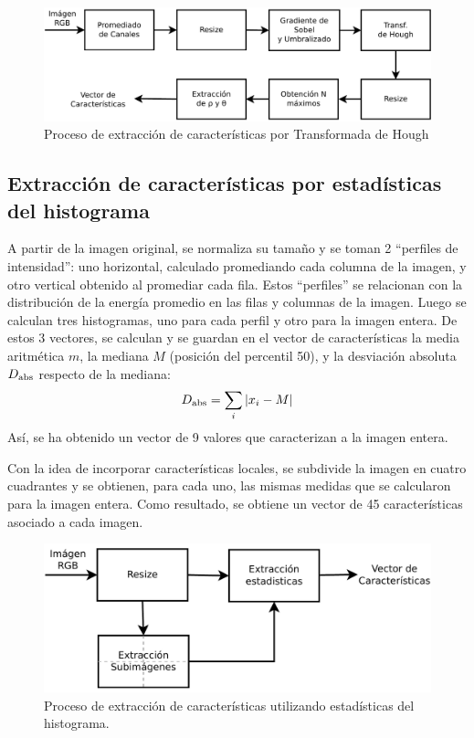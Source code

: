 \documentclass[conference,a4paper,10pt,oneside,final]{tfmpd}
\begin{document}
\begin{figure}
\begin{center}
\includegraphics[scale=0.25]{../diagramas/procesohough} 
\end{center}
\caption{Proceso de extracción de características por Transformada de Hough}
\label{procesohough}
\end{figure}
%
%
\subsection{Extracción de características por estadísticas del histograma}
A partir de la imagen original, se normaliza su tamaño y se toman 2
``perfiles de intensidad'': uno horizontal, calculado promediando
cada columna de la imagen, y otro vertical obtenido al promediar cada fila.
Estos ``perfiles'' se relacionan con la distribución de la energía promedio
en las filas y columnas de la imagen.
Luego se calculan tres histogramas, uno para cada perfil y otro para la
imagen entera. De estos 3 vectores, se calculan y se guardan en el
vector de características la media aritmética $m$, la mediana $M$ (posición del
percentil 50),  y la desviación absoluta $D_{\textrm{abs}}$ respecto de la mediana:
\begin{equation*}
D_{\textrm{abs}}=\sum_i |x_i - M|
\end{equation*}
Así, se ha obtenido un vector de 9 valores que caracterizan %
a la imagen entera.

Con la idea de incorporar características locales,
se subdivide la imagen en cuatro
cuadrantes y se obtienen, para cada uno, las mismas medidas que se calcularon
para  la imagen entera. Como resultado, se obtiene un vector de 45
características asociado a cada imagen.

\begin{figure}
\begin{center}
\includegraphics[scale=0.25]{../diagramas/procesoestadisticas}
\end{center}
\caption{Proceso de extracción de características utilizando estadísticas del
histograma.}
\label{procesoestadisticas}
\end{figure}
\end{document}

